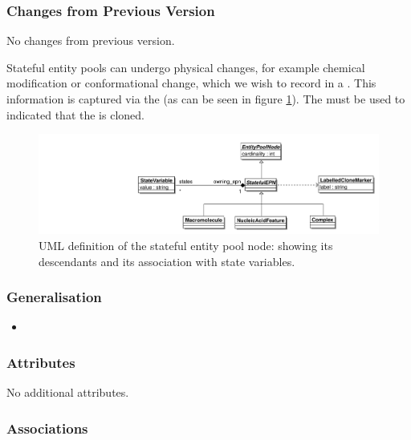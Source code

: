 \subsubsection{Changes from Previous Version}

No changes from previous version.

\label{defn:StatefulEPN}

Stateful entity pools can undergo physical changes, for example
chemical modification or conformational change, which we wish to record
in a \PDm. This information is captured via the
 (as can be seen in figure
\ref{fig:techref:statefulepnuml}). The  must be
used to indicated that the  is cloned.

\begin{figure}[htb]
  \centering
  \includegraphics[width=\textwidth]{images/statefulepnuml}
\caption{UML definition of the stateful entity pool node: showing its
  descendants and its association with state variables.}
  \label{fig:techref:statefulepnuml}
\end{figure}

\subsubsection{Generalisation}

\begin{itemize}
\item {}
\end{itemize}

\subsubsection{Attributes}

No additional attributes.

\subsubsection{Associations}

